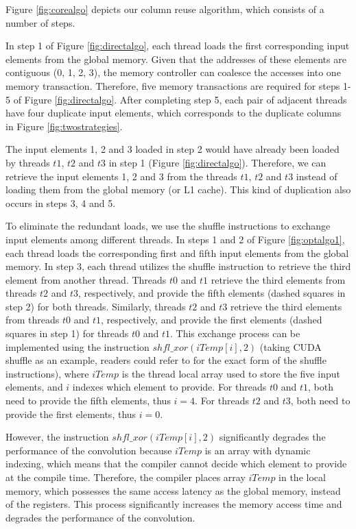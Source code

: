 Figure \ref{fig:corealgo} depicts our column reuse algorithm, which consists of a number of steps.

 In step 1 of Figure \ref{fig:directalgo}, each thread loads the first corresponding input elements from the
global memory. Given that the addresses of these elements are contiguous (0, 1, 2, 3), the memory controller can coalesce the accesses into
one memory transaction. Therefore, five memory transactions are required for steps 1-5 of Figure \ref{fig:directalgo}. After completing step 5, each pair of adjacent threads have four
duplicate input elements, which corresponds to the duplicate columns in Figure \ref{fig:twostrategies}.

The input elements 1, 2 and 3 loaded in step 2 would have already been loaded by threads $t1$, $t2$ and $t3$ in step 1 (Figure
\ref{fig:directalgo}). Therefore, we can retrieve the input elements 1, 2 and 3 from the threads $t1$, $t2$ and $t3$ instead of loading
them from the global memory (or L1 cache). This kind of duplication also occurs in steps 3, 4 and 5.

To eliminate the redundant loads, we use the shuffle instructions to exchange input elements among different threads. In steps 1
and 2 of Figure \ref{fig:optalgo1}, each thread loads the corresponding first and fifth input elements from the global memory. In step 3, each
thread utilizes the shuffle instruction to retrieve the third element from another thread. Threads $t0$ and $t1$ retrieve the third elements
from threads $t2$ and $t3$, respectively, and provide the fifth elements (dashed squares in step 2) for both threads.
Similarly, threads $t2$ and $t3$ retrieve the third elements from threads $t0$ and $t1$, respectively, and provide the first
elements (dashed squares in step 1) for threads $t0$ and $t1$. This exchange process can be implemented using the instruction
$shfl\_xor(iTemp[i],2)$ (taking CUDA shuffle as an example, readers could refer to \cite{CUDAtoolkit} for the exact form of the shuffle instructions), where $iTemp$ is the thread local
array used to store the five input elements, and $i$ indexes which element to provide. For threads $t0$ and $t1$, both need to provide the fifth
elements, thus $i=4$. For threads $t2$ and $t3$, both need to provide the first elements, thus $i=0$.

However, the instruction $shfl\_xor(iTemp[i],2)$ significantly degrades the performance of the convolution because $iTemp$ is an array with
dynamic indexing, which means that the compiler cannot decide which element to provide at the compile time. Therefore, the compiler
places array $iTemp$ in the local memory, which possesses the same access latency as the global memory, instead of the registers. This process significantly increases the memory access time and degrades the performance of the convolution.

